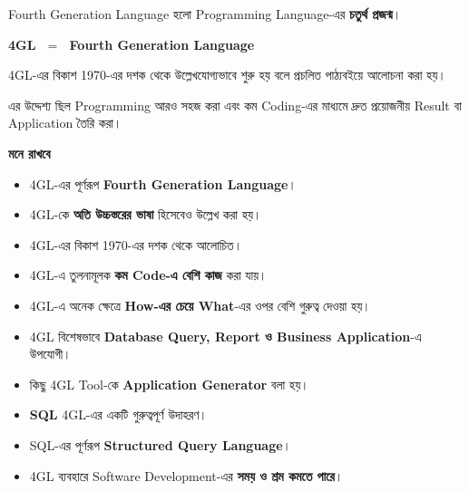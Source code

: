
Fourth Generation Language হলো Programming Language-এর
\textbf{চতুর্থ প্রজন্ম}।

\begin{center}

\textbf{
4GL
\(\;=\;\)
Fourth Generation Language
}

\end{center}

4GL-এর বিকাশ 1970-এর দশক থেকে উল্লেখযোগ্যভাবে শুরু হয় বলে
প্রচলিত পাঠ্যবইয়ে আলোচনা করা হয়।

এর উদ্দেশ্য ছিল Programming আরও সহজ করা এবং কম Coding-এর মাধ্যমে
দ্রুত প্রয়োজনীয় Result বা Application তৈরি করা।

\begin{rememberbox}

\textbf{\color{deepOrange}মনে রাখবে}

\begin{itemize}

\item 4GL-এর পূর্ণরূপ
\textbf{Fourth Generation Language}।

\item 4GL-কে \textbf{অতি উচ্চস্তরের ভাষা} হিসেবেও উল্লেখ করা হয়।

\item 4GL-এর বিকাশ 1970-এর দশক থেকে আলোচিত।

\item 4GL-এ তুলনামূলক
\textbf{কম Code-এ বেশি কাজ} করা যায়।

\item 4GL-এ অনেক ক্ষেত্রে
\textbf{How-এর চেয়ে What}-এর ওপর বেশি গুরুত্ব দেওয়া হয়।

\item 4GL বিশেষভাবে
\textbf{Database Query, Report ও Business Application}-এ উপযোগী।

\item কিছু 4GL Tool-কে
\textbf{Application Generator} বলা হয়।

\item \textbf{SQL} 4GL-এর একটি গুরুত্বপূর্ণ উদাহরণ।

\item SQL-এর পূর্ণরূপ
\textbf{Structured Query Language}।

\item 4GL ব্যবহারে Software Development-এর
\textbf{সময় ও শ্রম কমতে পারে}।

\end{itemize}

\end{rememberbox}

\small

